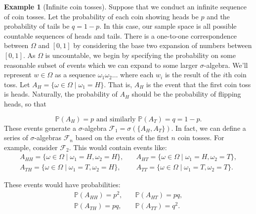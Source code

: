\documentclass[12pt]{article}
\newcommand{\calF}{\mathcal{F}}
\newcommand{\Prob}{\mathbb{P}}
\theoremstyle{definition}
\newtheorem{exmp}[thm]{Example}
\theoremstyle{remark}
\numberwithin{equation}{section}
\begin{document}
\begin{exmp}[Infinite coin tosses]
  Suppose that we conduct an infinite sequence of coin tosses. Let the probability of each coin showing heads be $p$ and the probability of tails be $q=1-p$. In this case, our sample space is all possible countable sequences of heads and tails. There is a one-to-one correspondence between $\Omega$ and $[0,1]$ by considering the base two expansion of numbers between $[0,1]$. As $\Omega$ is uncountable, we begin by specifying the probability on some reasonable subset of events which we can expand to some larger $\sigma$-algebra. We'll represent $w\in\Omega$ as a sequence $\omega_1\omega_2\ldots$ where each $w_i$ is the result of the $i$th coin toss. Let $A_H = \{ \omega\in\Omega\mid \omega_1 = H \}$.  That is, $A_H$ is the event that the first coin toss is heads. Naturally, the probability of $A_H$ should be the probability of flipping heads, so that

  \begin{equation}
    \Prob(A_H) = p \text{ and similarly } \Prob(A_T) = q = 1 - p.
  \end{equation}
  These events generate a $\sigma$-algebra $\calF_1 = \sigma(\{A_H, A_T \})$. In fact, we can define a series of $\sigma$-algebras $\calF_n$ based on the events of the first $n$ coin tosses. For example, consider $\calF_2$. This would contain events like:
\begin{align}
A_{HH} = \{\omega\in\Omega \mid \omega_1 = H, \omega_2 = H\}, &\quad A_{HT} = \{\omega\in\Omega \mid \omega_1 = H, \omega_2 = T\}, \\
A_{TH}= \{\omega\in\Omega \mid \omega_1 = T, \omega_2 = H\}, &\quad A_{TT}= \{\omega\in\Omega \mid \omega_1 = T, \omega_2 = T\}.
\end{align}

These events would have probabilities:
\begin{align}
  \Prob(A_{HH}) = p^2, &\quad \Prob(A_{HT}) = pq, \\
  \Prob(A_{TH}) = pq, &\quad \Prob(A_{TT}) = q^2.
\end{align}


\end{exmp}
\end{document}
